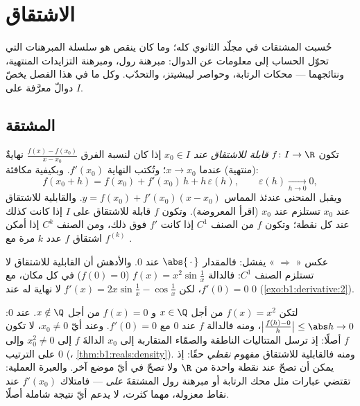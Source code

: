 \chapter{الاشتقاق}\label{ch:b1:derivative}

حُسبت المشتقات في مجلّد الثانوي كله؛ وما كان
ينقص هو سلسلة المبرهنات التي تحوّل الحساب إلى
معلومات عن الدوال: مبرهنة رول، ومبرهنة التزايدات المنتهية،
ونتائجهما --- محكات الرتابة، وحواصر ليبشيتز،
والتحدّب. وكل ما في هذا الفصل يخصّ دوالّ معرَّفة على
 $I$.

\section{المشتقة}

\begin{definition}\label{def:b1:derivative:def}
تكون $f \colon I \to \R$ \emph{قابلة للاشتقاق عند $x_0 \in
I$} إذا كان لنسبة الفرق
$\frac{f(x) - f(x_0)}{x - x_0}$ نهايةٌ (منتهية) عندما $x \to x_0$؛
وتُكتب النهاية $f'(x_0)$. وبكيفية مكافئة:
\[
f(x_0 + h) = f(x_0) + f'(x_0)\,h + h\,\varepsilon(h),
\qquad \varepsilon(h) \xrightarrow[h \to 0]{} 0 ,
\]
ويقبل المنحنى عندئذ المماس $y = f(x_0) + f'(x_0)(x -
x_0)$. والقابلية للاشتقاق عند $x_0$ تستلزم  عند $x_0$ (اقرأ
المعروضة). وتكون $f$ قابلة للاشتقاق على $I$ إذا كانت كذلك عند كل نقطة؛
وتكون $f$ من الصنف $C^1$ إذا كانت $f'$  فوق ذلك، ومن
الصنف $C^k$ إذا أمكن اشتقاق $f$
عدد $k$ مرة مع $f^{(k)}$ .
\end{definition}

\begin{example}\label{ex:b1:derivative:notc1}
عكس « $\Rightarrow$ » يفشل:
فالمقدار $\abs{\,\cdot\,}$ عند $0$. والأدهش أن القابلية للاشتقاق لا
تستلزم الصنف $C^1$: فالدالة $f(x) = x^2 \sin\frac 1x$ ($f(0) = 0$)
 في كل مكان، مع $f'(0) = 0$، لكن $f'(x) = 2x
\sin\frac1x - \cos\frac 1x$ لا نهاية له عند $0$
(\cref{exo:b1:derivative:2}).
\end{example}

\begin{example}\label{ex:b1:derivative:onepoint}
لتكن $f(x) = x^2$ من أجل $x \in \Q$ و $f(x) = 0$ من أجل $x \notin
\Q$. عند $0$: $\bigl|\frac{f(h) - 0}{h}\bigr| \leq \abs h \to 0$،
ومنه فالدالة $f$  عند $0$ مع $f'(0) = 0$. وعند أيّ $x_0
\neq 0$، لا تكون $f$  أصلًا: إذ ترسل المتتاليات الناطقة
والصمّاء المتقاربة إلى $x_0$ الدالةَ $f$ إلى $x_0^2 \neq 0$ وإلى
$0$ على الترتيب (، \cref{thm:b1:reals:density}). ومنه فالقابلية
للاشتقاق مفهوم \emph{نقطي} حقًا: إذ يمكن أن تصحّ
عند نقطة واحدة من $\R$ ولا تصحّ في أيّ موضع آخر. والعبرة
العملية: تقتضي عبارات مثل محك الرتابة أو مبرهنة رول
المشتقةَ \emph{على } --- فامتلاك
$f'(x_0)$ عند نقاط معزولة، مهما كثرت، لا يدعم أيّ
نتيجة شاملة أصلًا.
\end{example}

